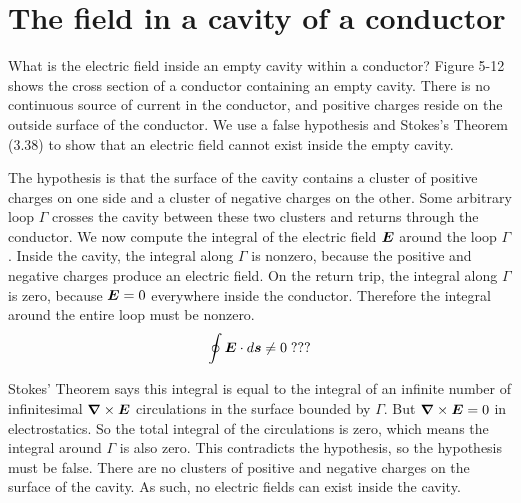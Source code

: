 \section{The field in a cavity of a conductor}

What is the electric field inside an empty cavity within a conductor?
Figure 5-12 shows the cross section of a conductor containing an empty cavity.
There is no continuous source of current in the conductor, and
positive charges reside on the outside surface of the conductor.
We use a false hypothesis and Stokes's Theorem (3.38) to show that 
an electric field cannot exist inside the empty cavity.

The hypothesis is that the surface of the cavity contains 
a cluster of positive charges on one side and a cluster of negative charges on the other.
Some arbitrary loop $\Gamma$ crosses the cavity
between these two clusters and returns through the conductor.
We now compute the integral of the electric field $\boldsymbol{E}$ around the loop $\Gamma$.
Inside the cavity, the integral along $\Gamma$ is nonzero,
because the positive and negative charges produce an electric field.
On the return trip, the integral along $\Gamma$ is zero,
because $\boldsymbol{E}=0$ everywhere inside the conductor.
Therefore the integral around the entire loop must be nonzero.
\begin{equation*}
  \oint \boldsymbol{E} \cdot d\boldsymbol{s} \not = 0 \; ???
\end{equation*}

Stokes' Theorem says this integral is equal to the integral of an infinite number of
infinitesimal $\boldsymbol{\nabla} \times \boldsymbol{E}$ circulations in the surface bounded by $\Gamma$.
But $\boldsymbol{\nabla} \times \boldsymbol{E} = 0$ in electrostatics.
So the total integral of the circulations is zero, which means the 
integral around $\Gamma$ is also zero.
This contradicts the hypothesis, so the hypothesis must be false.
There are no clusters of positive and negative charges on the surface of the cavity.
As such, no electric fields can exist inside the cavity.

